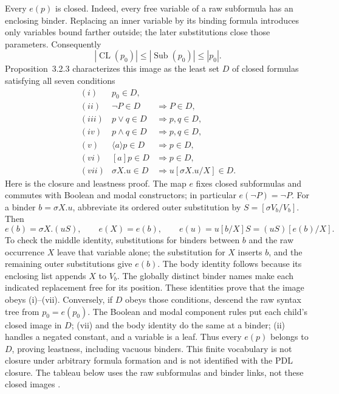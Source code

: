 Every \(e(p)\) is closed. Indeed, every free variable of a raw
subformula has an enclosing binder. Replacing an inner variable by
its binding formula introduces only variables bound farther outside;
the later substitutions close those parameters. Consequently
\[
 |\operatorname{CL}(p_0)|
   \leq|\operatorname{Sub}(p_0)|\leq|p_0|.
\]
Proposition~3.2.3 characterizes this image as the least set \(D\)
of closed formulas satisfying all seven conditions
\[
\begin{array}{rll}
 (i)&p_0\in D,\\
 (ii)&\neg P\in D&\Longrightarrow P\in D,\\
 (iii)&p\lor q\in D&\Longrightarrow p,q\in D,\\
 (iv)&p\land q\in D&\Longrightarrow p,q\in D,\\
 (v)&\langle a\rangle p\in D&\Longrightarrow p\in D,\\
 (vi)&[a]p\in D&\Longrightarrow p\in D,\\
 (vii)&\sigma X.u\in D&\Longrightarrow u[\sigma X.u/X]\in D.
\end{array}
\]
Here is the closure and leastness proof. The map \(e\) fixes
closed subformulas and commutes with Boolean and modal constructors;
in particular \(e(\neg P)=\neg P\). For a binder
\(b=\sigma X.u\), abbreviate its ordered outer substitution by
\(S=[\sigma V_b/V_b]\). Then
\[
 e(b)=\sigma X.(uS),\qquad e(X)=e(b),\qquad
 e(u)=u[b/X]S=(uS)[e(b)/X].
\]
To check the middle identity, substitutions for binders between
\(b\) and the raw occurrence \(X\) leave that variable alone;
the substitution for \(X\) inserts \(b\), and the remaining
outer substitutions give \(e(b)\). The body identity follows
because its enclosing list appends \(X\) to \(V_b\).
The globally distinct binder names make each indicated replacement
free for its position. These identities prove that the image obeys
(i)--(vii). Conversely, if \(D\) obeys those conditions, descend
the raw syntax tree from \(p_0=e(p_0)\). The Boolean and modal
component rules put each child's closed image in \(D\); (vii)
and the body identity do the same at a binder; (ii) handles a
negated constant, and a variable is a leaf. Thus every \(e(p)\)
belongs to \(D\), proving leastness, including vacuous binders.
This finite vocabulary is not closure under arbitrary formula formation
and is not identified with the PDL closure. The tableau below uses
the raw subformulas and binder links, not these closed images
\cite[defs.~3.2.1--3.2.2, prop.~3.2.3, pp.~336--337]{Kozen1983}.

